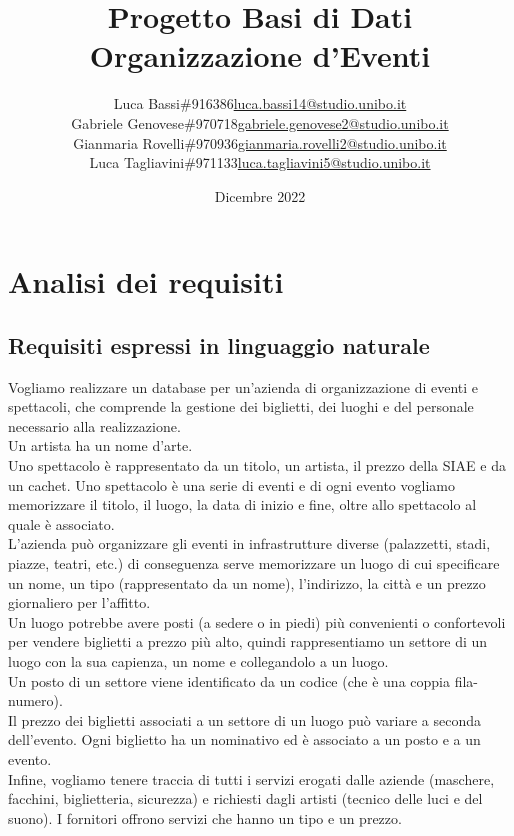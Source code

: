 \documentclass[a4paper,11pt]{article}
\title{\textbf{Progetto Basi di Dati \\ \large Organizzazione d'Eventi}}
\author{
  \begin{tabular}{l l l}
    Luca Bassi & \#916386 & \href{mailto:luca.bassi14@studio.unibo.it}{luca.bassi14@studio.unibo.it}\\
    Gabriele Genovese & \#970718 & \href{mailto:gabriele.genovese2@studio.unibo.it}{gabriele.genovese2@studio.unibo.it}\\
    Gianmaria Rovelli & \#970936 & \href{mailto:gianmaria.rovelli2@studio.unibo.it}{gianmaria.rovelli2@studio.unibo.it}\\
    Luca Tagliavini & \#971133 & \href{mailto:luca.tagliavini5@studio.unibo.it}{luca.tagliavini5@studio.unibo.it}
  \end{tabular}
}
\date{Dicembre 2022}
\begin{document}
\maketitle

\tableofcontents

\newpage

\section{Analisi dei requisiti}

\subsection{Requisiti espressi in linguaggio naturale}

Vogliamo realizzare un database per un'azienda di organizzazione di eventi e spettacoli, che comprende la gestione dei biglietti, dei luoghi e del personale necessario alla realizzazione.\\
Un artista ha un nome d'arte.\\
Uno spettacolo è rappresentato da un titolo, un artista, il prezzo della SIAE e da un cachet. Uno spettacolo è una serie di eventi e di ogni evento vogliamo memorizzare il titolo, il luogo, la data di inizio e fine, oltre allo spettacolo al quale è associato.\\
L'azienda può organizzare gli eventi in infrastrutture diverse (palazzetti, stadi, piazze, teatri, etc.) di conseguenza serve memorizzare un luogo di cui specificare un nome, un tipo (rappresentato da un nome), l'indirizzo, la città e un prezzo giornaliero per l'affitto.\\
Un luogo potrebbe avere posti (a sedere o in piedi) più convenienti o confortevoli per vendere biglietti a prezzo più alto, quindi rappresentiamo un settore di un luogo con la sua capienza, un nome e collegandolo a un luogo.\\
Un posto di un settore viene identificato da un codice (che è una coppia fila-numero).\\
Il prezzo dei biglietti associati a un settore di un luogo può variare a seconda dell'evento. Ogni biglietto ha un nominativo ed è associato a un posto e a un evento.\\
Infine, vogliamo tenere traccia di tutti i servizi erogati dalle aziende (maschere, facchini, biglietteria, sicurezza) e richiesti dagli artisti (tecnico delle luci e del suono). I fornitori offrono servizi che hanno un tipo e un prezzo.
\end{document}
